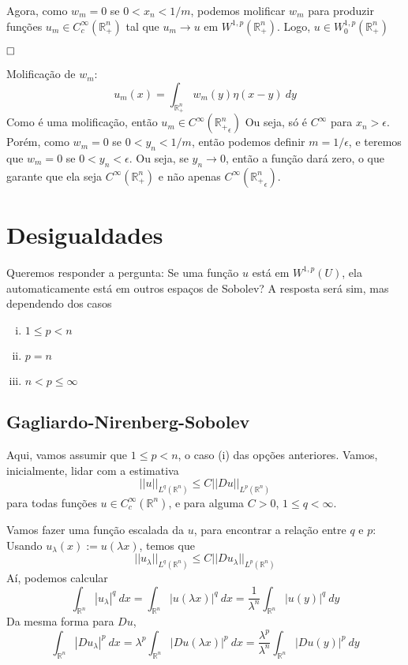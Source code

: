 \documentclass[11pt]{article}
\newcommand{\qed}{$\hfill\square$}
\newcommand{\R}{\mathbb{R}}
\newcommand{\Rn}{{\mathbb{R}^n}}
\newcommand{\e}{\epsilon}
\newcommand{\nor}[2]{||#1||_{#2}}
\begin{document}
Agora, como $ w_m=0 $ se $ 0 < x_n < 1/m $, podemos molificar $ w_m $ para produzir funções $ u_m \in C^\infty_c(\R^n_+) $ tal que $ u_m \rightarrow u \text{ em } W^{1,p}(\R^n_+)$. Logo, $ u \in W^{1,p}_0 (\R^n_+) $

\qed

Molificação de $w_m$: \[ u_m(x) = \int_{\R^n_+} w_m(y) \eta(x-y)\ dy \] Como é uma molificação, então $u_m \in C^\infty({\R^n_+}_\e)$ Ou seja, só é $C^\infty$ para $x_n> \e$. Porém, como $w_m=0$ se $0 < y_n < 1/m$, então podemos definir $m=1/\e$, e teremos que $w_m=0$ se $0 < y_n < \e$. Ou seja, se $y_n \rightarrow 0$, então a função dará zero, o que garante que ela seja $C^\infty({\R^n_+})$ e não apenas $C^\infty({\R^n_+}_\e)$.



\section{Desigualdades}

Queremos responder a pergunta: Se uma função $ u $ está em $ W^{1,p}(U) $, ela automaticamente está em outros espaços de Sobolev? A resposta será sim, mas dependendo dos casos \begin{enumerate}[(i)]
	\item $ 1 \leq p < n $
	\item $ p = n $
	\item $ n < p \leq \infty $
\end{enumerate}

\subsection{Gagliardo-Nirenberg-Sobolev}

Aqui, vamos assumir que $ 1 \leq p < n $, o caso (i) das opções anteriores. Vamos, inicialmente, lidar com a estimativa \[ \nor{u}{L^q(\Rn)} \leq C \nor{Du}{L^p(\Rn)}\] para todas funções $ u \in C^\infty_c(\Rn) $, e para alguma $ C>0 $, $ 1 \leq q < \infty $.

Vamos fazer uma função escalada da $ u $, para encontrar a relação entre $ q $ e $ p $: Usando $ u_{\lambda}(x):=u(\lambda x) $, temos que \[ \nor{u_{\lambda}}{L^q(\Rn)} \leq C \nor{Du_\lambda}{L^p(\Rn)}\] Aí, podemos calcular \[ \int_\Rn |u_{\lambda}|^q\ dx =  \int_\Rn |u(\lambda x)|^q\ dx = \frac{1}{\lambda^n} \int_\Rn |u(y)|^q\ dy\] Da mesma forma para $ Du $, \[ \int_\Rn |Du_{\lambda}|^p\ dx =  \lambda^p \int_\Rn |Du(\lambda x)|^p\ dx = \frac{\lambda^p}{\lambda^n} \int_\Rn |Du(y)|^p\ dy\]
\end{document}
